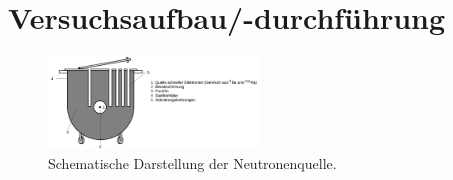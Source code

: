 \section{Versuchsaufbau/-durchführung}
\begin{figure}
  \centering
  \includegraphics[width=0.5\textwidth]{pics/aufbau.png}
  \caption{Schematische Darstellung der Neutronenquelle\cite{anleitung702}.}
  \label{fig: neutronenquelle}
\end{figure}
